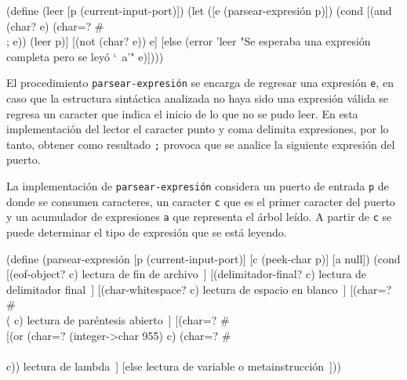 \nwenddocs{}\endmoddef
(define (leer [p (current-input-port)])
  (let ([e (parsear-expresión p)])
    (cond
     [(and (char? e) (char=? #\\; e))
      (leer p)]
     [(not (char? e))
      e]
     [else
      (error 'leer "Se esperaba una expresión completa pero se leyó `~a'" e)])))

\eatline
{}\nwendcode{}\nwdocspar

El procedimiento {\tt{}\protect{}parsear-expresión} se encarga de regresar una expresión {\tt{}e}, en caso que la estructura sintáctica analizada no haya sido una expresión válida se regresa un caracter que indica el inicio de lo que no se pudo leer. En esta implementación del lector el caracter punto y coma delimita expresiones, por lo tanto, obtener como resultado {\tt{}{}{};} provoca que se analice la siguiente expresión del puerto.

La implementación de {\tt{}\protect{}parsear-expresión} considera un puerto de entrada {\tt{}p} de donde se consumen caracteres, un caracter {\tt{}c} que es el primer caracter del puerto y un acumulador de expresiones {\tt{}a} que representa el árbol leído. A partir de {\tt{}c} se puede determinar el tipo de expresión que se está leyendo.


\nwenddocs{}\plusendmoddef
(define (parsear-expresión [p (current-input-port)]
                           [c (peek-char p)]
                           [a null])
  (cond
   [(eof-object? c)
    \LA{}lectura de fin de archivo~{\nwtagstyle{}}\RA{}]
   [(delimitador-final? c)
    \LA{}lectura de delimitador final~{\nwtagstyle{}}\RA{}]
   [(char-whitespace? c)
    \LA{}lectura de espacio en blanco~{\nwtagstyle{}}\RA{}]
   [(char=? #\\( c)
    \LA{}lectura de paréntesis abierto~{\nwtagstyle{}}\RA{}]
   [(char=? #\\[ c)
    \LA{}lectura de hueco~{\nwtagstyle{}\subpageref{NWlam9-lecG-1}}\RA{}]
   [(or (char=? (integer->char 955) c)
        (char=? #\\\\ c))
    \LA{}lectura de lambda~{\nwtagstyle{}}\RA{}]
   [else
    \LA{}lectura de variable o metainstrucción~{\nwtagstyle{}}\RA{}]))

